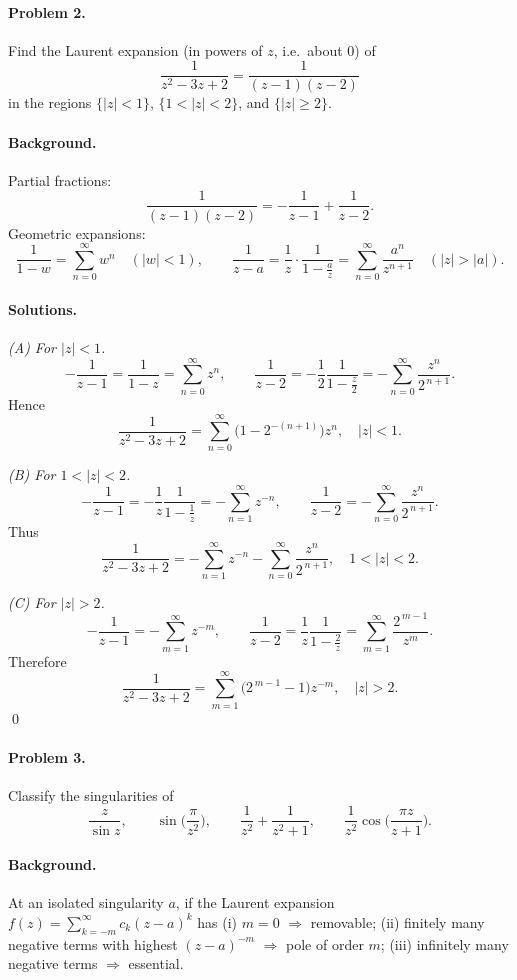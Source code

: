 \documentclass[11pt,a4paper]{article}
\theoremstyle{definition}
\theoremstyle{definition}
\theoremstyle{plain}
\theoremstyle{remark}
\begin{document}
\paragraph{Problem 2.}
Find the Laurent expansion (in powers of $z$, i.e.\ about $0$) of
\[
\frac{1}{z^{2}-3z+2}=\frac{1}{(z-1)(z-2)}
\]
in the regions $\{|z|<1\}$, $\{1<|z|<2\}$, and $\{|z|\ge 2\}$.

\paragraph{Background.}
Partial fractions:
\[
\frac{1}{(z-1)(z-2)}=-\frac{1}{z-1}+\frac{1}{z-2}.
\]
Geometric expansions:
\[
\frac{1}{1-w}=\sum_{n=0}^{\infty}w^{n}\quad(|w|<1),\qquad
\frac{1}{z-a}=\frac{1}{z}\cdot\frac{1}{1-\frac{a}{z}}
=\sum_{n=0}^{\infty}\frac{a^{n}}{z^{n+1}}\quad(|z|>|a|).
\]

\paragraph{Solutions.}

\emph{(A) For $|z|<1$.}
\[
-\frac{1}{z-1}=\frac{1}{1-z}=\sum_{n=0}^{\infty}z^{n},\qquad
\frac{1}{z-2}=-\frac{1}{2}\frac{1}{1-\frac{z}{2}}
=-\sum_{n=0}^{\infty}\frac{z^{n}}{2^{\,n+1}}.
\]
Hence
\[
\boxed{\ \frac{1}{z^{2}-3z+2}=\sum_{n=0}^{\infty}\Big(1-2^{-(n+1)}\Big)z^{n},\quad |z|<1.\ }
\]

\medskip
\emph{(B) For $1<|z|<2$.}
\[
-\frac{1}{z-1}=-\frac{1}{z}\frac{1}{1-\frac{1}{z}}
=-\sum_{n=1}^{\infty} z^{-n},\qquad
\frac{1}{z-2}=-\sum_{n=0}^{\infty}\frac{z^{n}}{2^{\,n+1}}.
\]
Thus
\[
\boxed{\ \frac{1}{z^{2}-3z+2}
	=-\sum_{n=1}^{\infty} z^{-n}-\sum_{n=0}^{\infty}\frac{z^{n}}{2^{\,n+1}},
	\quad 1<|z|<2.\ }
\]

\medskip
\emph{(C) For $|z|>2$.}
\[
-\frac{1}{z-1}=-\sum_{m=1}^{\infty} z^{-m},\qquad
\frac{1}{z-2}=\frac{1}{z}\frac{1}{1-\frac{2}{z}}
=\sum_{m=1}^{\infty}\frac{2^{\,m-1}}{z^{m}}.
\]
Therefore
\[
\boxed{\ \frac{1}{z^{2}-3z+2}
	=\sum_{m=1}^{\infty}\big(2^{\,m-1}-1\big)z^{-m},\quad |z|>2.\ }
\]
\qed

\paragraph{Problem 3.}
Classify the singularities of
\[
\frac{z}{\sin z},\qquad
\sin\!\Big(\frac{\pi}{z^{2}}\Big),\qquad
\frac{1}{z^{2}}+\frac{1}{z^{2}+1},\qquad
\frac{1}{z^{2}}\cos\!\Big(\frac{\pi z}{z+1}\Big).
\]

\paragraph{Background.}
At an isolated singularity $a$, if the Laurent expansion
$f(z)=\sum_{k=-m}^{\infty} c_k (z-a)^k$ has
(i) $m=0$ $\Rightarrow$ removable;
(ii) finitely many negative terms with highest $(z-a)^{-m}$ $\Rightarrow$ pole of order $m$;
(iii) infinitely many negative terms $\Rightarrow$ essential.
\end{document}
